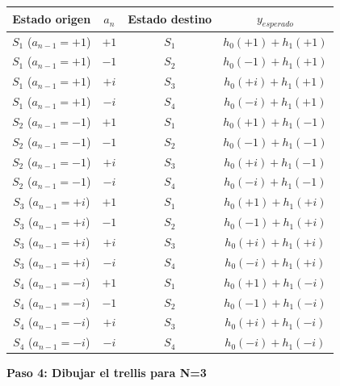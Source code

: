 \documentclass[11pt,a4paper]{article}
\begin{document}
\begin{center}
\small
\begin{tabular}{|c|c|c|c|}
\hline
\textbf{Estado origen} & \textbf{$a_n$} & \textbf{Estado destino} & \textbf{$y_{esperado}$} \\
\hline
$S_1$ ($a_{n-1}=+1$) & $+1$ & $S_1$ & $h_0(+1) + h_1(+1)$ \\
$S_1$ ($a_{n-1}=+1$) & $-1$ & $S_2$ & $h_0(-1) + h_1(+1)$ \\
$S_1$ ($a_{n-1}=+1$) & $+i$ & $S_3$ & $h_0(+i) + h_1(+1)$ \\
$S_1$ ($a_{n-1}=+1$) & $-i$ & $S_4$ & $h_0(-i) + h_1(+1)$ \\
\hline
$S_2$ ($a_{n-1}=-1$) & $+1$ & $S_1$ & $h_0(+1) + h_1(-1)$ \\
$S_2$ ($a_{n-1}=-1$) & $-1$ & $S_2$ & $h_0(-1) + h_1(-1)$ \\
$S_2$ ($a_{n-1}=-1$) & $+i$ & $S_3$ & $h_0(+i) + h_1(-1)$ \\
$S_2$ ($a_{n-1}=-1$) & $-i$ & $S_4$ & $h_0(-i) + h_1(-1)$ \\
\hline
$S_3$ ($a_{n-1}=+i$) & $+1$ & $S_1$ & $h_0(+1) + h_1(+i)$ \\
$S_3$ ($a_{n-1}=+i$) & $-1$ & $S_2$ & $h_0(-1) + h_1(+i)$ \\
$S_3$ ($a_{n-1}=+i$) & $+i$ & $S_3$ & $h_0(+i) + h_1(+i)$ \\
$S_3$ ($a_{n-1}=+i$) & $-i$ & $S_4$ & $h_0(-i) + h_1(+i)$ \\
\hline
$S_4$ ($a_{n-1}=-i$) & $+1$ & $S_1$ & $h_0(+1) + h_1(-i)$ \\
$S_4$ ($a_{n-1}=-i$) & $-1$ & $S_2$ & $h_0(-1) + h_1(-i)$ \\
$S_4$ ($a_{n-1}=-i$) & $+i$ & $S_3$ & $h_0(+i) + h_1(-i)$ \\
$S_4$ ($a_{n-1}=-i$) & $-i$ & $S_4$ & $h_0(-i) + h_1(-i)$ \\
\hline
\end{tabular}
\end{center}

\textbf{Paso 4: Dibujar el trellis para N=3}
\end{document}
